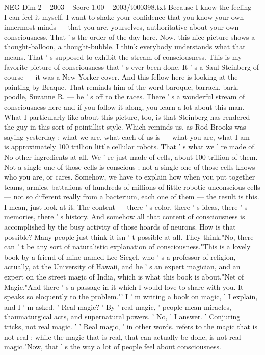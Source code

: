 \begin{textsample}{NEG Dim 2 – 2003 – Score 1.00 – 2003/t000398.txt}
Because I know the feeling — I can feel it myself.
I want to shake your confidence that you know your own innermost minds — that you are, yourselves, authoritative about your own consciousness.
That ' s the order of the day here.
Now, this nice picture shows a thought-balloon, a thought-bubble.
I think everybody understands what that means.
That ' s supposed to exhibit the stream of consciousness.
This is my favorite picture of consciousness that ' s ever been done.
It ' s a Saul Steinberg of course — it was a New Yorker cover.
And this fellow here is looking at the painting by Braque.
That reminds him of the word baroque, barrack, bark, poodle, Suzanne R. — he ' s off to the races.
There ' s a wonderful stream of consciousness here and if you follow it along, you learn a lot about this man.
What I particularly like about this picture, too, is that Steinberg has rendered the guy in this sort of pointillist style.
Which reminds us, as Rod Brooks was saying yesterday : what we are, what each of us is — what you are, what I am — is approximately 100 trillion little cellular robots.
That ' s what we ' re made of.
No other ingredients at all.
We ' re just made of cells, about 100 trillion of them.
Not a single one of those cells is conscious ; not a single one of those cells knows who you are, or cares.
Somehow, we have to explain how when you put together teams, armies, battalions of hundreds of millions of little robotic unconscious cells — not so different really from a bacterium, each one of them — the result is this.
I mean, just look at it.
The content — there ' s color, there ' s ideas, there ' s memories, there ' s history.
And somehow all that content of consciousness is accomplished by the busy activity of those hoards of neurons.
How is that possible?
Many people just think it isn ' t possible at all.
They think,"No, there can ' t be any sort of naturalistic explanation of consciousness."This is a lovely book by a friend of mine named Lee Siegel, who ' s a professor of religion, actually, at the University of Hawaii, and he ' s an expert magician, and an expert on the street magic of India, which is what this book is about,"Net of Magic."And there ' s a passage in it which I would love to share with you.
It speaks so eloquently to the problem."' I ' m writing a book on magic, ' I explain, and I ' m asked, ' Real magic? ' By ' real magic, ' people mean miracles, thaumaturgical acts, and supernatural powers. ' No, ' I answer. ' Conjuring tricks, not real magic. ' ' Real magic, ' in other words, refers to the magic that is not real ; while the magic that is real, that can actually be done, is not real magic."Now, that ' s the way a lot of people feel about consciousness.

\end{textsample}

